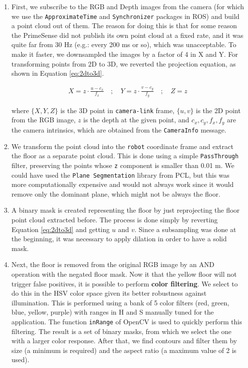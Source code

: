 \begin{enumerate}
\item First, we subscribe to the RGB and Depth images from the camera (for which we use the \texttt{ApproximateTime} and \texttt{Synchronizer} packages in ROS) and build a point cloud out of them. The reason for doing this is that for some reason the PrimeSense did not publish its own point cloud at a fixed rate, and it was quite far from 30 Hz (e.g.: every 200 ms or so), which was unacceptable. To make it faster, we downsampled the images by a factor of 4 in X and Y. For transforming points from 2D to 3D, we reverted the projection equation, as shown in Equation \ref{eq:2dto3d}.

\begin{align}
\label{eq:2dto3d}
X = z\cdot\frac{u - c_x}{f_x} \quad ; \quad
Y = z\cdot\frac{v - c_y}{f_y} \quad ; \quad 
Z = z
\end{align}

where $\{X,Y,Z\}$ is the 3D point in \texttt{camera-link} frame, $\{u,v\}$ is the 2D point from the RGB image, $z$ is the depth at the given point, and $c_x, c_y, f_x, f_y$ are the camera intrinsics, which are obtained from the \texttt{CameraInfo} message. 

\item We transform the point cloud into the \texttt{robot} coordinate frame and extract the floor as a separate point cloud. This is done using a simple \texttt{PassThrough} filter, preserving the points whose \texttt{z} component is smaller than 0.01 m. We could have used the \texttt{Plane Segmentation} library from PCL, but this was more computationally expensive and would not always work since it would remove only the dominant plane, which might not be always the floor.

\item A binary mask is created representing the floor by just reprojecting the floor point cloud extracted before. The process is done simply by reverting Equation \ref{eq:2dto3d} and getting $u$ and $v$. Since a subsampling was done at the beginning, it was necessary to apply dilation in order to have a solid mask.

\item Next, the floor is removed from the original RGB image by an AND operation with the negated floor mask. Now it that the yellow floor will not trigger false positives, it is possible to perform \textbf{color filtering}. We select to do this in the HSV color space given its better robustness against illumination. This is performed using a bank of 5 color filters (red, green, blue, yellow, purple) with ranges in H and S manually tuned for the application. The function \texttt{inRange} of OpenCV is used to quickly perform this filtering. The result is a set of binary masks, from which we select the one with a larger color response. After that, we find contours and filter them by size (a minimum is required) and the aspect ratio (a maximum value of 2 is used). 


\end{enumerate}
